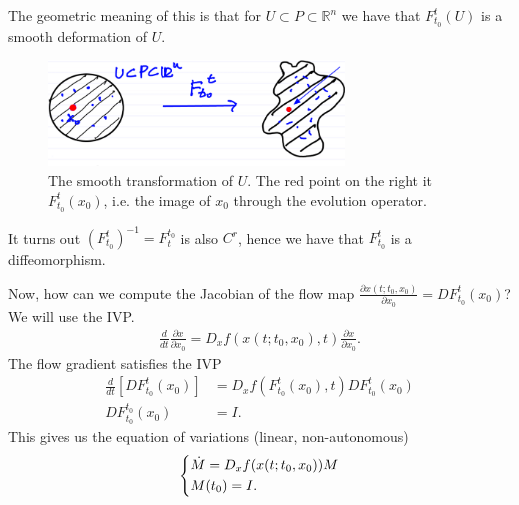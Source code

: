 The geometric meaning of this is that for $U \subset P \subset \mathbb{R}^{n}$ we have that $F_{t_0}^{t}(U)$ is a smooth deformation of $U$.
\begin{figure}[h]
	\centering
	\includegraphics[width=0.7\textwidth]{figures/ch1/7smooth_transform.png}
	\caption{The smooth transformation of $U$. The red point on the right it $F _{t_0}^t(x_0)$, i.e. the image of $x_0$ through the evolution operator.}
\end{figure}
It turns out $\left(F_{t_0}^{t}\right)^{-1} = F_{t}^{t_0}$ is also $C^r$, hence we have that $F_{t_0}^{t}$ is a diffeomorphism. 

Now, how can we compute the Jacobian of the flow map $\frac{\partial x(t; t_0, x_0)}{ \partial x_0} = DF _{t_0}^{t}(x_0)$? We will use the IVP.
\begin{align}
	\frac{d}{dt}\frac{\partial x}{\partial x_0} = D_x f(x(t; t_0, x_0), t) \frac{\partial x}{\partial x_0}.
\end{align}
The flow gradient satisfies the IVP
\begin{align}
	\frac{d}{dt}\left[ DF_{t_0}^{t}(x_0)\right] &= D_{x}f(F_{t_0}^{t}(x_0), t) DF_{t_0}^{t}(x_0) \\
	DF_{t_0}^{t_0}(x_0) &= I.
\end{align}
This gives us the equation of variations (linear, non-autonomous)
\begin{align}
	\begin{dcases}
		\dot{M} = D_x f(x(t; t_0, x_0)) M \\ M(t_0) = I.
	\end{dcases}
\end{align}


